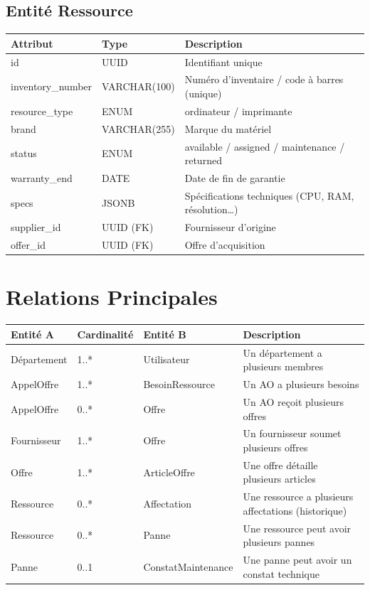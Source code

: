 \documentclass[12pt,a4paper]{report}
\begin{document}
\subsection{Entité Ressource}

\begin{tabularx}{\textwidth}{|L{3cm}|L{3cm}|L{7cm}|}
\hline
{}\textbf{Attribut} & \textbf{Type} & \textbf{Description} \\
\hline
id & UUID & Identifiant unique \\
\hline
inventory\_number & VARCHAR(100) & Numéro d'inventaire / code à barres (unique) \\
\hline
resource\_type & ENUM & ordinateur / imprimante \\
\hline
brand & VARCHAR(255) & Marque du matériel \\
\hline
status & ENUM & available / assigned / maintenance / returned \\
\hline
warranty\_end & DATE & Date de fin de garantie \\
\hline
specs & JSONB & Spécifications techniques (CPU, RAM, résolution…) \\
\hline
supplier\_id & UUID (FK) & Fournisseur d'origine \\
\hline
offer\_id & UUID (FK) & Offre d'acquisition \\
\hline
\end{tabularx}

\section{Relations Principales}

\begin{tabularx}{\textwidth}{|L{3.5cm}|C{2cm}|L{3.5cm}|L{5cm}|}
\hline
{}\textbf{Entité A} & \textbf{Cardinalité} & \textbf{Entité B} & \textbf{Description} \\
\hline
Département & 1..* & Utilisateur & Un département a plusieurs membres \\
\hline
AppelOffre & 1..* & BesoinRessource & Un AO a plusieurs besoins \\
\hline
AppelOffre & 0..* & Offre & Un AO reçoit plusieurs offres \\
\hline
Fournisseur & 1..* & Offre & Un fournisseur soumet plusieurs offres \\
\hline
Offre & 1..* & ArticleOffre & Une offre détaille plusieurs articles \\
\hline
Ressource & 0..* & Affectation & Une ressource a plusieurs affectations (historique) \\
\hline
Ressource & 0..* & Panne & Une ressource peut avoir plusieurs pannes \\
\hline
Panne & 0..1 & ConstatMaintenance & Une panne peut avoir un constat technique \\
\hline
\end{tabularx}
\end{document}
